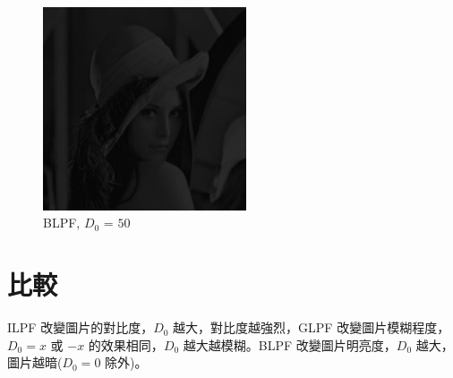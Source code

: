 \documentclass[conference]{IEEEtran}
\begin{document}
\begin{figure}[H]
\centerline{\includegraphics[width=6cm]{BLPF50.jpg}}
\caption{BLPF, $D_0$ = $50$}
\label{BLPF50}
\end{figure}

\section{比較}
ILPF 改變圖片的對比度，$D_0$ 越大，對比度越強烈，GLPF 改變圖片模糊程度，$D_0=x$ 或 $-x$ 的效果相同，$D_0$ 越大越模糊。BLPF 改變圖片明亮度，$D_0$ 越大，圖片越暗($D_0=0$ 除外)。


\vspace{12pt}
\end{document}
